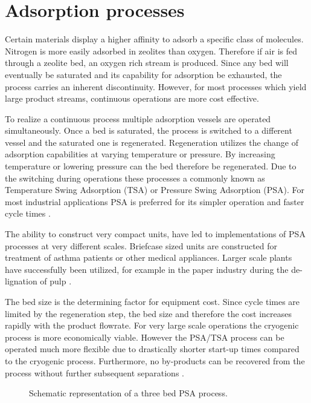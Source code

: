     \section{Adsorption processes}
    \label{sec:psa}
    Certain materials display a higher affinity to adsorb a specific class of molecules. Nitrogen is
    more easily adsorbed in zeolites than oxygen. Therefore if air is fed through a
    zeolite bed, an oxygen rich stream is produced. Since any bed will eventually
    be saturated and its capability for adsorption be exhausted, the process carries an
    inherent discontinuity. However, for most processes which yield large product streams,
    continuous operations are more cost effective.

    To realize a continuous process multiple adsorption vessels are operated simultaneously.
    Once a bed is saturated, the process is switched to a different vessel and the saturated one
    is regenerated. Regeneration utilizes the change of adsorption capabilities at varying temperature
    or pressure. By increasing temperature or lowering pressure can the bed therefore be regenerated.
    Due to the switching during operations these processes a commonly known as Temperature Swing Adsorption
    (TSA) or Pressure Swing Adsorption (PSA). For most industrial applications PSA is preferred for its
    simpler operation and faster cycle times \cite{Smith.2001}.

    The ability to construct very compact units, have led to implementations of PSA processes at
    very different scales. Briefcase sized units are constructed for treatment of asthma patients or other
    medical appliances. Larger scale plants have successfully been utilized, for example in the paper industry
    during the de-lignation of pulp \cite{Nelson.1993}.

    The bed size is the determining factor for equipment cost. Since cycle times are limited by the regeneration
    step, the bed size and therefore the cost increases rapidly with the product flowrate. For very large
    scale operations the cryogenic process is more economically viable. However the PSA/TSA process can be operated
    much more flexible due to drastically shorter start-up times compared to the cryogenic process. Furthermore, no
    by-products can be recovered from the process without further subsequent separations \cite{Choi.2003}.

    \begin{figure}
    	\center
    	
    	\caption{Schematic representation of a three bed PSA process.}
    	\label{fig:PSA}
    \end{figure}

